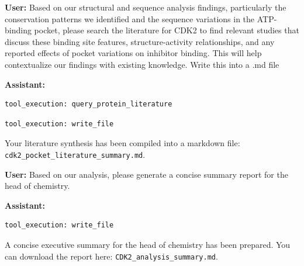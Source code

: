 \documentclass{article}
\begin{document}
\vspace{1.5em}

\begin{userbox}
\textbf{User:} Based on our structural and sequence analysis findings, particularly the conservation patterns we identified and the sequence variations in the ATP-binding pocket, please search the literature for CDK2 to find relevant studies that discuss these binding site features, structure-activity relationships, and any reported effects of pocket variations on inhibitor binding. This will help contextualize our findings with existing knowledge.
Write this into a .md file
\end{userbox}
\vspace{1.5em}

\begin{assistantbox}
\textbf{Assistant:}
\begin{verbatim}
tool_execution: query_protein_literature
\end{verbatim}

\begin{verbatim}
tool_execution: write_file
\end{verbatim}
Your literature synthesis has been compiled into a markdown file: \texttt{cdk2\_pocket\_literature\_summary.md}.
\end{assistantbox}

\vspace{1.5em}

\begin{userbox}
\textbf{User:} Based on our analysis, please generate a concise summary report for the head of chemistry.
\end{userbox}

\begin{assistantbox}
\textbf{Assistant:}
\begin{verbatim}
tool_execution: write_file
\end{verbatim}
A concise executive summary for the head of chemistry has been prepared. You can download the report here: \texttt{CDK2\_analysis\_summary.md}.
\end{assistantbox}
\end{document}
